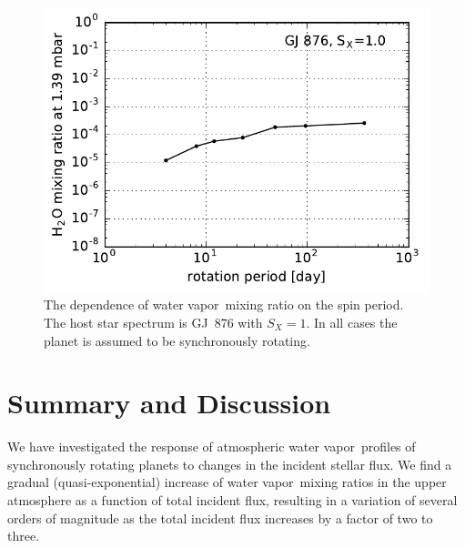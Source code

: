 \documentclass[11pt,numberedappendix,twocolappendix,]{emulateapj}
\newcommand{\wv}{{\color{orange}water vapor\ }}
\begin{document}
\begin{figure}[!h]
    \begin{center}
    \includegraphics[width=\hsize]{fig/xH2O_Prot.pdf}
    \end{center}
\caption{The dependence of \wv mixing ratio on the spin period. The host star spectrum is GJ~876 with $S_X=1$. In all cases the planet is assumed to be synchronously rotating. }
\label{fig:changeP}
\end{figure}




\section{Summary and Discussion}
\label{s:summary}

We have investigated the response of atmospheric \wv profiles of synchronously rotating planets to changes in the incident stellar flux. 
We find a gradual (quasi-exponential) increase of \wv mixing ratios in the upper atmosphere as a function of total incident flux, resulting in a variation of several orders of magnitude as the total incident flux increases by a factor of two to three. 
\end{document}
